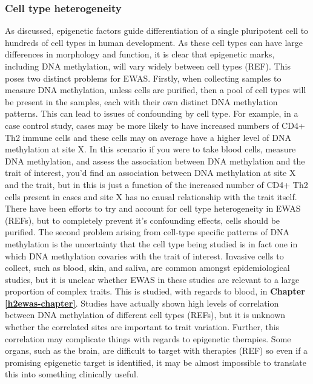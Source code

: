 \documentclass[11pt,twoside]{bristolthesis}
\begin{document}
\hypertarget{cell-type-heterogeneity}{%
\subsubsection{Cell type heterogeneity}\label{cell-type-heterogeneity}}

As discussed, epigenetic factors guide differentiation of a single pluripotent cell to hundreds of cell types in human development. As these cell types can have large differences in morphology and function, it is clear that epigenetic marks, including DNA methylation, will vary widely between cell types (REF). This poses two distinct problems for EWAS. Firstly, when collecting samples to measure DNA methylation, unless cells are purified, then a pool of cell types will be present in the samples, each with their own distinct DNA methylation patterns. This can lead to issues of confounding by cell type. For example, in a case control study, cases may be more likely to have increased numbers of CD4+ Th2 immune cells and these cells may on average have a higher level of DNA methylation at site X. In this scenario if you were to take blood cells, measure DNA methylation, and assess the association between DNA methylation and the trait of interest, you'd find an association between DNA methylation at site X and the trait, but in this is just a function of the increased number of CD4+ Th2 cells present in cases and site X has no causal relationship with the trait itself. There have been efforts to try and account for cell type heterogeneity in EWAS (REFs), but to completely prevent it's confounding effects, cells should be purified. The second problem arising from cell-type specific patterns of DNA methylation is the uncertainty that the cell type being studied is in fact one in which DNA methylation covaries with the trait of interest. Invasive cells to collect, such as blood, skin, and saliva, are common amongst epidemiological studies, but it is unclear whether EWAS in these studies are relevant to a large proportion of complex traits. This is studied, with regards to blood, in \textbf{Chapter \ref{h2ewas-chapter}}. Studies have actually shown high levels of correlation between DNA methylation of different cell types (REFs), but it is unknown whether the correlated sites are important to trait variation. Further, this correlation may complicate things with regards to epigenetic therapies. Some organs, such as the brain, are difficult to target with therapies (REF) so even if a promising epigenetic target is identified, it may be almost impossible to translate this into something clinically useful.
\end{document}
